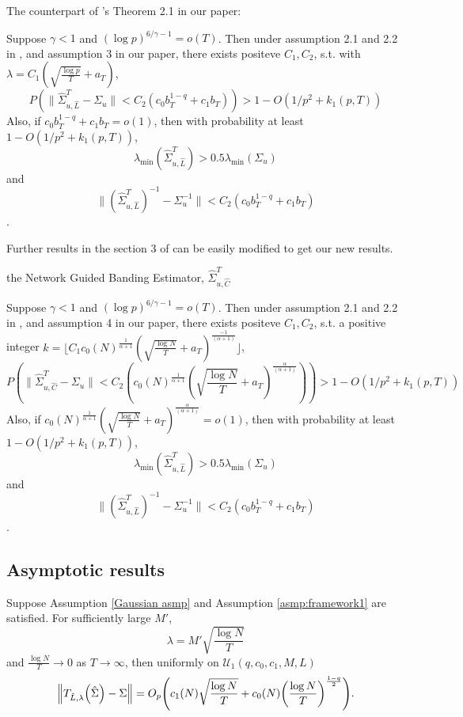 \begin{thm}
    The counterpart of \cite{fanHighDimensionalCovarianceMatrix2011}'s Theorem 2.1 in our paper:

Suppose $\gamma < 1$ and $(\log p)^{6/\gamma - 1} = o(T)$. Then under assumption 2.1 and 2.2 in \cite{fanHighDimensionalCovarianceMatrix2011}, and assumption 3 in our paper, there exists positeve $C_1, C_2$, s.t. with $\lambda = C_1 (\sqrt{\frac{\log p}{T}} + a_T)$, 
$$ P( \| \hat \Sigma_{u,\hat L}^T - \Sigma_u \| < C_2( c_0 b_T^{1-q} + c_1 b_T ) ) > 1 - O(1/p^2 + k_1 (p,T)) $$
Also, if $c_0 b_T^{1-q} + c_1 b_T = o(1)$, then with probability at least $1 - O(1/p^2 + k_1 (p,T))$, $$\lambda_{\min} (\hat \Sigma_{u,\hat L}^T) > 0.5 \lambda_{\min} (\Sigma_u)$$ and $$\| (\hat \Sigma_{u,\hat L}^T)^{-1} - \Sigma_u^{-1} \| < C_2 (c_0 b_T^{1-q} + c_1 b_T) $$.
\end{thm}

 Further results in the section 3 of \cite{fanHighDimensionalCovarianceMatrix2011} can be easily modified to get our new results.

the Network Guided Banding Estimator, $\hat \Sigma_{u,\hat C}^T$
\begin{thm}
    Suppose $\gamma < 1$ and $(\log p)^{6/\gamma - 1} = o(T)$. Then under assumption 2.1 and 2.2 in \cite{fanHighDimensionalCovarianceMatrix2011}, and assumption 4 in our paper, there exists positeve $C_1, C_2$, s.t. a positive integer $k = \lfloor C_1 c_0(N)^\frac{1}{\alpha+1}  ( \sqrt{\frac{\log N}{T}} + a_T )^\frac{-1}{(\alpha+1)} \rfloor$, 
$$ P( \| \hat \Sigma_{u,\hat C}^T - \Sigma_u \| < C_2( c_0(N)^\frac{1}{\alpha+1}  ( \sqrt{\frac{\log N}{T}} + a_T )^\frac{\alpha}{(\alpha+1)} ) ) > 1 - O(1/p^2 + k_1 (p,T)) $$
Also, if $c_0(N)^\frac{1}{\alpha+1}  ( \sqrt{\frac{\log N}{T}} + a_T )^\frac{\alpha}{(\alpha+1)} = o(1)$, then with probability at least $1 - O(1/p^2 + k_1 (p,T))$, $$\lambda_{\min} (\hat \Sigma_{u,\hat L}^T) > 0.5 \lambda_{\min} (\Sigma_u)$$ and $$\| (\hat \Sigma_{u,\hat L}^T)^{-1} - \Sigma_u^{-1} \| < C_2 (c_0 b_T^{1-q} + c_1 b_T) $$.
\end{thm}

\subsection{Asymptotic results}
\begin{thm}
    Suppose Assumption \autoref{Gaussian asmp} and Assumption \autoref{asmp:framework1} are satisfied. For sufficiently large \(M'\), 
    \begin{equation*}
        \lambda = M' \sqrt{\frac{\log N}{T}}
    \end{equation*}
    and \(\frac{\log N}{T} \to 0\) as \(T \to \infty\), 
    then uniformly on $\mathcal{U}_1 (q, c_{0}, c_{1}, M, L)$ 
    \begin{equation*}
    \norm{T_{\hat{L},\lambda}\pqty{\hat{\Sigma}} - \Sigma } = O_{p}\pqty{c_{1}(N) \sqrt{\frac{\log N}{T}}+c_{0}(N)\pqty{\frac{\log N}{T}}^{\frac{1-q}{2}}}.
    \end{equation*}
    \label{theorem1}
\end{thm}

